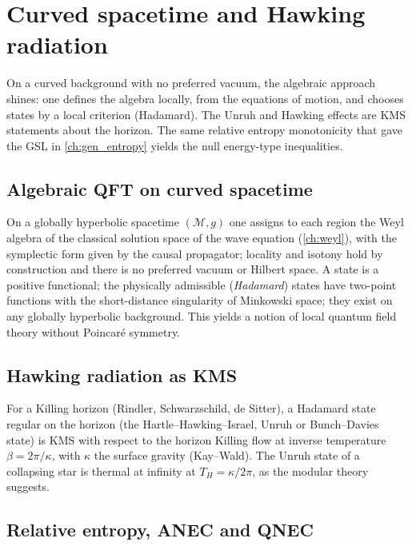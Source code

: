 \chapter{Curved spacetime and Hawking radiation}\label{ch:curved_hawking}
\skippable

\begin{physmotiv}
On a curved background with no preferred vacuum, the algebraic approach shines: one defines the algebra locally, from the equations of motion, and chooses states by a local criterion (Hadamard). The Unruh and Hawking effects are KMS statements about the horizon. The same relative entropy monotonicity that gave the GSL in \cref{ch:gen_entropy} yields the null energy-type inequalities.
\end{physmotiv}

\section{Algebraic QFT on curved spacetime}

On a globally hyperbolic spacetime $(\mathcal M,g)$ one assigns to each region the Weyl algebra of the classical solution space of the wave equation (\cref{ch:weyl}), with the symplectic form given by the causal propagator; locality and isotony hold by construction and there is no preferred vacuum or Hilbert space. A state is a positive functional; the physically admissible (\emph{Hadamard}) states have two-point functions with the short-distance singularity of Minkowski space; they exist on any globally hyperbolic background. This yields a notion of local quantum field theory without Poincar\'e symmetry.

\section{Hawking radiation as KMS}

For a Killing horizon (Rindler, Schwarzschild, de Sitter), a Hadamard state regular on the horizon (the Hartle--Hawking--Israel, Unruh or Bunch--Davies state) is KMS with respect to the horizon Killing flow at inverse temperature $\beta=2\pi/\kappa$, with $\kappa$ the surface gravity (Kay--Wald). The Unruh state of a collapsing star is thermal at infinity at $T_H=\kappa/2\pi$, as the modular theory suggests.

\section{Relative entropy, ANEC and QNEC}

